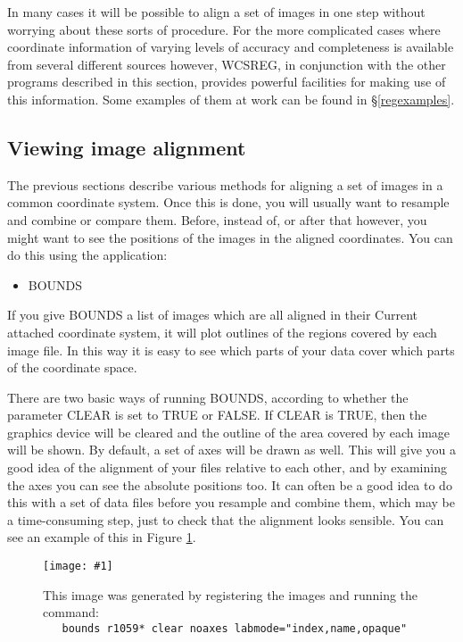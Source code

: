 \documentclass[twoside,11pt]{article}
\newcommand{\htmladdimg}[1]{}
\newcommand{\hyperref}[4]{#2\ref{#4}#3}
\newcommand{\htmlref}[2]{#1}
\newcommand{\xlabel}[1]{}
\renewcommand{\_}{\texttt{\symbol{95}}}
\newcommand{\routine}[1]{{\sc #1}}
\newcommand{\xroutine}[1]{\htmlref{{\sc #1}}{#1}}
\newcommand{\myfig} [5] {
  \begin{figure}
    \centering\texttt{[image: \#1]}
    \typeout{#1 inserted on page \arabic{page}}
    \caption{\label{#4}#5}
  \end{figure}
  }
\newcommand{\myfig}[5]{
    \htmladdimg{#3}\\
    Figure: \label{#4} #5
    }
\begin{document}
In many cases it will be possible to align a set of images in
one step without worrying about these sorts of procedure.
For the more complicated cases where 
coordinate information of varying levels of 
accuracy and completeness is available from several
different sources however,
\routine{WCSREG}, in conjunction with the other programs described
in this section, provides powerful facilities for making use of
this information.  Some examples of them at work can be found
in \hyperref{the examples section}{\S }{}{regexamples}.


\subsection{\xlabel{view-align}\label{view-align}Viewing image alignment}

The previous sections describe various methods for aligning 
a set of images in a common coordinate system.  
Once this is done, you will usually want to resample and combine
or compare them.
Before, instead of, or after that however, you might want to see
the positions of the images in the aligned coordinates. 
You can do this using the application:
\begin{itemize}
\item \xroutine{BOUNDS}
\end{itemize}
If you give \routine{BOUNDS} 
a list of images which are all aligned in their 
Current attached coordinate system, it will plot
outlines of the regions covered by each image file.  
In this way it is easy to see 
which parts of your data cover which parts of the coordinate space.

There are two basic ways of running \routine{BOUNDS}, according
to whether the parameter CLEAR is set to TRUE or FALSE.
If CLEAR is TRUE, then the graphics device will be cleared and
the outline of the area covered by each image will be shown.
By default, a set of axes will be drawn as well.
This will 
give you a good idea of the alignment of your files relative to
each other, and by examining the axes you can see the absolute
positions too.  It can often be a good idea to do this with 
a set of data files before you resample and combine them,
which may be a time-consuming step, just
to check that the alignment looks sensible.
You can see an example of this in Figure \ref{OUTCLEAR}.

\myfig{sun139outclear.eps}{height=0.5\textheight}{outclear.gif}{OUTCLEAR}{
This image was generated by registering the images and running the 
command:\protect\\
{\tt\ \ \ bounds r1059* clear noaxes labmode="index,name,opaque"}}
\end{document}
